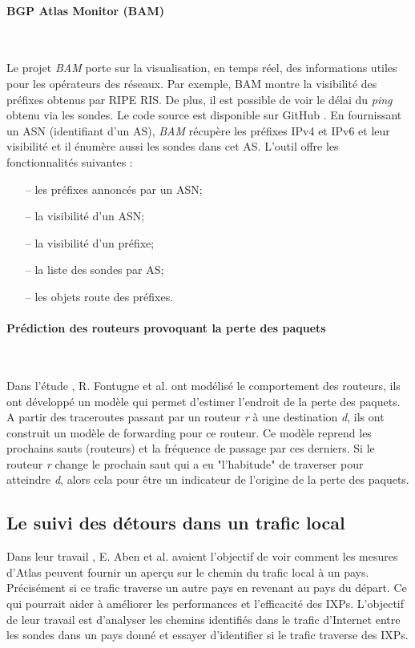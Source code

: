 \paragraph{BGP Atlas Monitor (BAM)} ~

Le projet \textit{BAM} porte sur la visualisation, en temps réel,  des informations utiles pour les opérateurs des réseaux. Par exemple, BAM montre  la visibilité des préfixes obtenus par RIPE RIS. De plus,  il est possible de voir  le délai du \textit{ping} obtenu via les sondes. Le code source est disponible sur  GitHub \cite{bam}. En fournissant un ASN (identifiant d'un AS), \textit{BAM} récupère les préfixes IPv4 et IPv6 et leur visibilité et il énumère aussi les sondes dans cet AS. L'outil offre  les  fonctionnalités suivantes :
\begin{itemize}
	\item[--] les préfixes annoncés par un ASN;
	\item[--] la visibilité d'un ASN;
	\item[--] la visibilité d'un préfixe;
	\item[--] la liste des sondes par AS;
	\item[--] les objets  route des préfixes.
\end{itemize}

\paragraph{Prédiction des routeurs provoquant la perte des paquets }~

Dans l'étude \cite{DBLP:journals/corr/FontugneAPB16}, R. Fontugne et al. ont modélisé le comportement  des routeurs, ils ont développé un modèle qui permet d'estimer l'endroit de la  perte des paquets. A partir des traceroutes passant par un routeur \textit{r} à une destination \textit{d}, ils ont construit un modèle de forwarding pour ce routeur. Ce modèle reprend les prochains sauts (routeurs) et la fréquence de passage par ces derniers. Si le routeur \textit{r} change le prochain saut qui a eu "l'habitude" de traverser  pour atteindre \textit{d}, alors cela pour être un indicateur de l'origine  de la perte des paquets.

\subsection{Le suivi des détours dans un trafic local}

Dans leur travail \cite{Emile-Aben-IXP-countries}, E. Aben et al. avaient l'objectif de  voir comment les mesures d'Atlas peuvent fournir un aperçu sur le chemin du trafic local à un pays. Précisément si ce trafic traverse un autre pays en revenant au pays du départ.  Ce qui pourrait  aider à améliorer les performances et l'efficacité des IXPs.  L'objectif de leur travail  est  d'analyser les chemins identifiés dans le trafic d'Internet entre les sondes dans un pays donné et essayer d'identifier si le trafic  traverse des IXPs.


